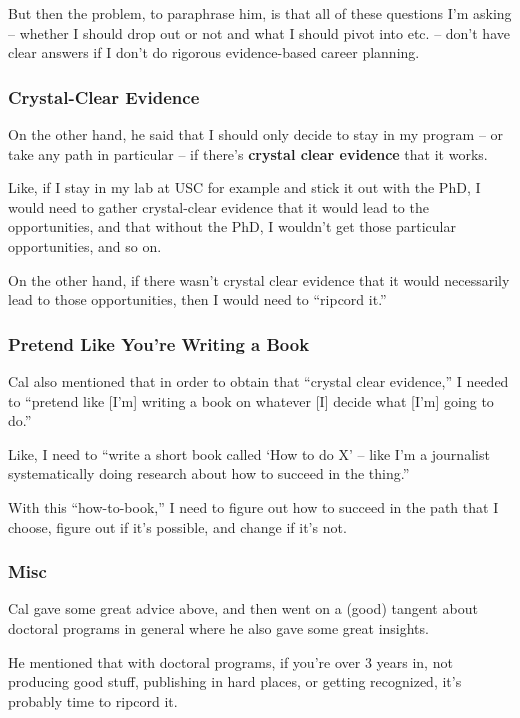 \documentclass[11pt]{article}
\begin{document}
But then the problem, to paraphrase him, is that all of these questions I'm asking -- whether I should drop out or not and what I should pivot into etc. -- don't have clear answers if I don't do rigorous evidence-based career planning.

\subsubsection*{Crystal-Clear Evidence}

On the other hand, he said that I should only decide to stay in my program -- or take any path in particular -- if there's \textbf{crystal clear evidence} that it works.

Like, if I stay in my lab at USC for example and stick it out with the PhD, I would need to gather crystal-clear evidence that it would lead to the opportunities, and that without the PhD, I wouldn't get those particular opportunities, and so on.

On the other hand, if there wasn't crystal clear evidence that it would necessarily lead to those opportunities, then I would need to ``ripcord it.''

\subsubsection*{Pretend Like You're Writing a Book}

Cal also mentioned that in order to obtain that ``crystal clear evidence,'' I needed to ``pretend like [I'm] writing a book on whatever [I] decide what [I'm] going to do.''

Like, I need to ``write a short book called `How to do X' -- like I'm a journalist systematically doing research about how to succeed in the thing.''

With this ``how-to-book,'' I need to figure out how to succeed in the path that I choose, figure out if it's possible, and change if it's not.

\subsubsection*{Misc}

Cal gave some great advice above, and then went on a (good) tangent about doctoral programs in general where he also gave some great insights.

He mentioned that with doctoral programs, if you're over 3 years in, not producing good stuff, publishing in hard places, or getting recognized, it's probably time to ripcord it.
\end{document}
